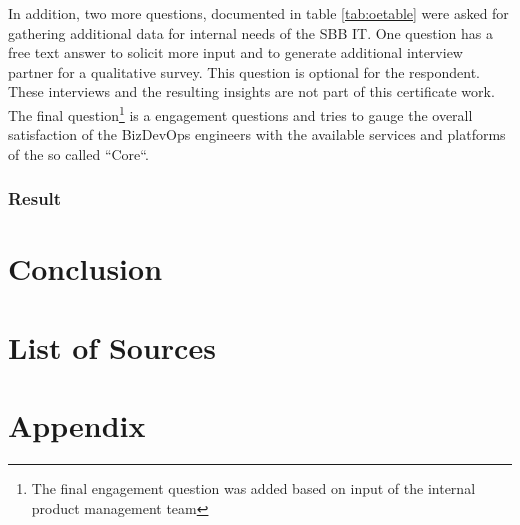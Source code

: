 \documentclass[a4paper,12pt]{article}
\begin{document}
    In addition, two more questions, documented in table \ref{tab:oetable} were asked for gathering additional data for
    internal needs of the SBB IT.
    One question has a free text answer to solicit more input and to generate additional interview partner
    for a qualitative survey.
    This question is optional for the respondent.
    These interviews and the resulting insights are not part of this certificate work.
    The final question\footnote{The final engagement question was added based on input of the internal product management team}
    is a engagement questions and tries to gauge the overall satisfaction of the BizDevOps engineers
    with the available services and platforms of the so called ``Core``.

    \subsubsection{Result}


    \section{Conclusion}
    \label{sec:conclusion}
    \pagebreak


    \section{List of Sources}
    \label{sec:bibliograhpy}
    \printbibliography[heading=none]


    \section{Appendix}
    \label{sec:appendix}
\end{document}
